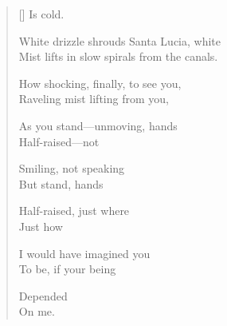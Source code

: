 \label{ch:venice_venezia}
\settowidth{\versewidth}{Mist lifts in slow spirals from the canals.}
\begin{verse}[\versewidth]
                                 Is cold.

White drizzle shrouds Santa Lucia, white\\
Mist lifts in slow spirals from the canals.

How shocking, finally, to see you,\\
Raveling mist lifting from you,

As you stand---unmoving, hands\\
Half-raised---not

Smiling, not speaking\\
But stand, hands

Half-raised, just where\\
Just how

I would have imagined you\\
To be, if your being

Depended\\
On me.
\end{verse}
